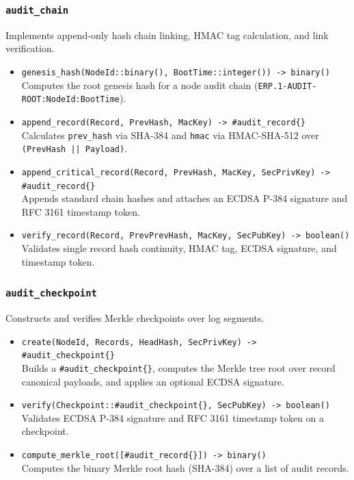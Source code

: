 \documentclass{article}
\begin{document}
\subsubsection{\texttt{audit\_chain}}
Implements append-only hash chain linking, HMAC tag calculation, and link verification.
\begin{itemize}
    \item \texttt{genesis\_hash(NodeId::binary(), BootTime::integer()) -> binary()} \\
    Computes the root genesis hash for a node audit chain (\texttt{ERP.1-AUDIT-ROOT:NodeId:BootTime}).
    \item \texttt{append\_record(Record, PrevHash, MacKey) -> \#audit\_record\{\}} \\
    Calculates \texttt{prev\_hash} via SHA-384 and \texttt{hmac} via HMAC-SHA-512 over \texttt{(PrevHash || Payload)}.
    \item \texttt{append\_critical\_record(Record, PrevHash, MacKey, SecPrivKey) -> \#audit\_record\{\}} \\
    Appends standard chain hashes and attaches an ECDSA P-384 signature and RFC 3161 timestamp token.
    \item \texttt{verify\_record(Record, PrevPrevHash, MacKey, SecPubKey) -> boolean()} \\
    Validates single record hash continuity, HMAC tag, ECDSA signature, and timestamp token.
\end{itemize}

\subsubsection{\texttt{audit\_checkpoint}}
Constructs and verifies Merkle checkpoints over log segments.
\begin{itemize}
    \item \texttt{create(NodeId, Records, HeadHash, SecPrivKey) -> \#audit\_checkpoint\{\}} \\
    Builds a \texttt{\#audit\_checkpoint\{\}}, computes the Merkle tree root over record canonical payloads, and applies an optional ECDSA signature.
    \item \texttt{verify(Checkpoint::\#audit\_checkpoint\{\}, SecPubKey) -> boolean()} \\
    Validates ECDSA P-384 signature and RFC 3161 timestamp token on a checkpoint.
    \item \texttt{compute\_merkle\_root([\#audit\_record\{\}]) -> binary()} \\
    Computes the binary Merkle root hash (SHA-384) over a list of audit records.
\end{itemize}
\end{document}
